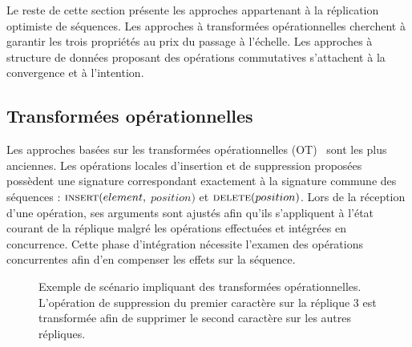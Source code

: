 Le reste de cette section présente les approches appartenant à la réplication
optimiste de séquences. Les approches à transformées opérationnelles cherchent à
garantir les trois propriétés au prix du passage à l'échelle. Les approches à
structure de données proposant des opérations commutatives s'attachent à la
convergence et à l'intention.

\subsection{Transformées opérationnelles}
\label{repl:subsec:ot}

Les approches basées sur les transformées opérationnelles
(OT)~\cite{sun1998operational, sun2009contextbased} sont les plus anciennes. Les
opérations locales d'insertion et de suppression proposées possèdent une
signature correspondant exactement à la signature commune des séquences :
$\textsc{insert}(element,$ $position)$ et $\textsc{delete}(position)$. Lors de
la réception d'une opération, ses arguments sont ajustés afin qu'ils
s'appliquent à l'état courant de la réplique malgré les opérations effectuées et
intégrées en concurrence. Cette phase d'intégration nécessite l'examen des
opérations concurrentes afin d'en compenser les effets sur la séquence.


\begin{figure}
  \centering
  
  \caption[Exemple de transformées opérationnelles] {\label{repl:fig:otexample}
    Exemple de scénario impliquant des transformées opérationnelles. L'opération
    de suppression du premier caractère sur la réplique 3 est transformée afin
    de supprimer le second caractère sur les autres répliques.}
\end{figure}

